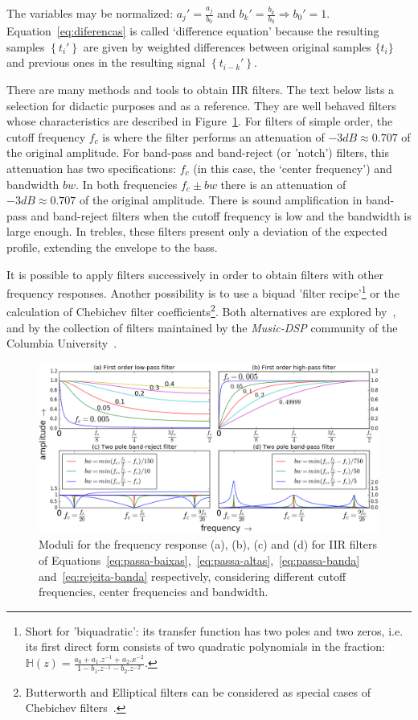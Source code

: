 The variables may be normalized: $a_j'=\frac{a_j}{b_0}$ and $b_k'=\frac{b_k}{b_0} \Rightarrow b_0' = 1$.
Equation~\ref{eq:diferencas} is called `difference equation' because the resulting samples 
$\left\{t_i'\right\}$ are given by weighted differences between original samples $\{t_i\}$ 
and previous ones in the resulting signal $\left\{t_{i-k}'\right\}$.

There are many methods and tools to obtain IIR filters. The text below lists a selection for didactic purposes and as a reference. They are well behaved filters whose characteristics are described in Figure~\ref{fig:iir}. For filters of simple order, the cutoff frequency $f_c$ is where the filter performs an attenuation of $-3dB \approx 0.707 $ of the original amplitude.
For band-pass and band-reject (or 'notch') filters, this attenuation has two specifications: $f_c$ (in this case, the `center frequency') and bandwidth $bw$. In both frequencies $f_c \pm bw$ there is an attenuation of $-3dB \approx 0.707$ of the original amplitude.
There is sound amplification in band-pass and band-reject filters when the cutoff frequency is low and the bandwidth is large enough. In trebles, these filters present only a deviation of the expected profile, extending the envelope to the bass.

It is possible to apply filters successively in order to obtain filters with other frequency responses. Another possibility is to use a biquad 'filter recipe'\footnote{Short for 'biquadratic': its transfer function has two poles and two zeros, i.e. its first direct form consists of two quadratic polynomials in the fraction: $\mathbb{H}(z)=\frac{a_0+a_1.z^{-1}+a_2.x^{-2}}{1- b_1.z^{-1} -b_2 . z^{-2}}$.} or the calculation of Chebichev filter coefficients\footnote{Butterworth and Elliptical filters can be considered as special cases of Chebichev filters~\cite{Openheim,smith}.}.
Both alternatives are explored by~\cite{JOSFM,smith}, and by the collection of filters maintained by the \emph{Music-DSP} community of the Columbia University~\cite{music-dsp,Openheim}.

\begin{figure}
    \centering
        \includegraphics[width=\textwidth]{figures/iir__}
    \caption{Moduli for the frequency response (a), (b), (c) and (d) for IIR filters of Equations~\ref{eq:passa-baixas},~\ref{eq:passa-altas},~\ref{eq:passa-banda} and~\ref{eq:rejeita-banda} respectively, considering different cutoff frequencies, center frequencies and bandwidth.}
        \label{fig:iir}
\end{figure}

